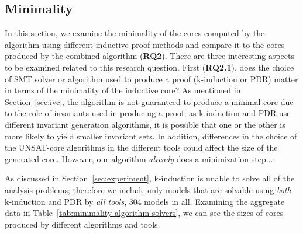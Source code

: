 \subsection{Minimality}
\label{sec:minimality}
In this section, we examine the minimality of the cores computed by the \ucalg algorithm using different inductive proof methods and compare it to the cores produced by the combined algorithm (\textbf{RQ2}).  There are three interesting aspects to be examined related to this research question.  First (\textbf{RQ2.1}), does the choice of SMT solver or algorithm used to produce a proof (k-induction or PDR) matter in terms of the minimality of the inductive core?   As mentioned in Section~\ref{sec:ivc}, the \ucalg algorithm is not guaranteed to produce a minimal core due to the role of invariants used in producing a proof; as k-induction and PDR use different invariant generation algorithms, it is possible that one or the other is more likely to yield smaller invariant sets.  In addition, differences in the choice of the UNSAT-core algorithms in the different tools could affect the size of the generated core.  However, our algorithm {\em already} does a minimization step....

As discussed in Section~\ref{sec:experiment}, k-induction is unable to solve all of the analysis problems; therefore we include only models that are solvable using {\em both} k-induction and PDR by {\em all tools}, 304 models in all.  Examining the aggregate data in Table~\ref{tab:minimality-algorithm-solvers}, we can see the sizes of cores produced by different algorithms and tools.







